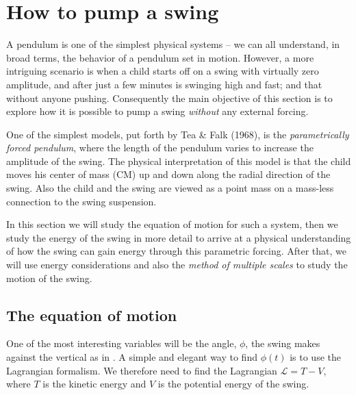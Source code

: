
\section{How to pump a swing}
A pendulum is one of the simplest physical systems -- we can all
understand, in broad terms, the behavior of a pendulum set in
motion. However, a more intriguing scenario is when a child starts off
on a swing with virtually zero amplitude, and after just a few minutes
is swinging high and fast; and that without anyone pushing.
Consequently the main objective of this section is to explore how it
is possible to pump a swing \emph{without} any external forcing. 

One of the simplest models, put forth by Tea \& Falk (1968), %
is the \emph{parametrically forced
  pendulum}, where the length of the pendulum varies to increase the
amplitude of the swing. The physical interpretation of this model is
that the child moves his center of mass (CM) up and down along the radial
direction of the swing. Also the child and the swing are viewed as a
point mass on a mass-less connection to the swing suspension. 

In this section we will study the equation of motion for such a system,
then we study the energy of the swing in more detail to arrive at a
physical understanding of how the swing can gain energy through this
parametric forcing. 
After that, we will use energy considerations and also the
\emph{method of multiple scales} to study the motion of the swing.

\subsection{The equation of motion}
One of the most interesting variables will be the angle, $\phi$,
the swing makes against the vertical as in . 
A simple and elegant way to find $\phi(t)$ is to use the Lagrangian
formalism. We therefore need to find the Lagrangian $\mathcal{L}=T-V$,
where $T$ is the kinetic energy and $V$ is the potential energy of the
swing. 

